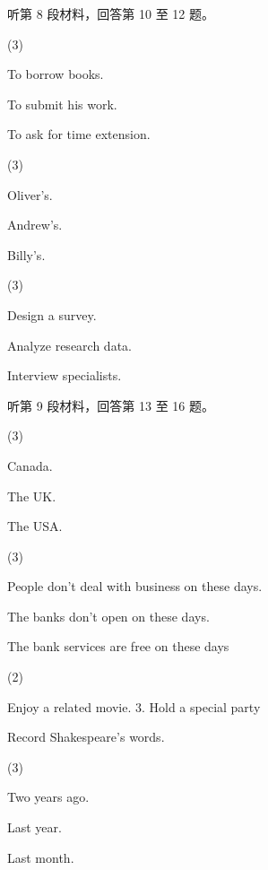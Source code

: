 \documentclass{英语试卷}
\begin{document}
\par 听第 8 段材料，回答第 10 至 12 题。\par
{}
\begin{choices}(3)
  \item To borrow books.
  \item To submit his work.
  \item To ask for time extension.
\end{choices}
\begin{choices}(3)
  \item Oliver's.
  \item Andrew's.
  \item Billy's.
\end{choices}
\begin{choices}(3)
  \item Design a survey.
  \item Analyze research data.
  \item Interview specialists.
\end{choices}
\par 听第 9 段材料，回答第 13 至 16 题。\par
{}
\begin{choices}(3)
  \item Canada.
  \item The UK.
  \item The USA.
\end{choices}
\begin{choices}(3)
  \item People don't deal with business on these days.
  \item The banks don't open on these days.
  \item The bank services are free on these days
\end{choices}
\begin{choices}(2)
  \item Enjoy a related movie. 3. Hold a special party
  \item Record Shakespeare's words.
\end{choices}
\begin{choices}(3)
  \item Two years ago.
  \item Last year.
  \item Last month.
\end{choices}
\end{document}
